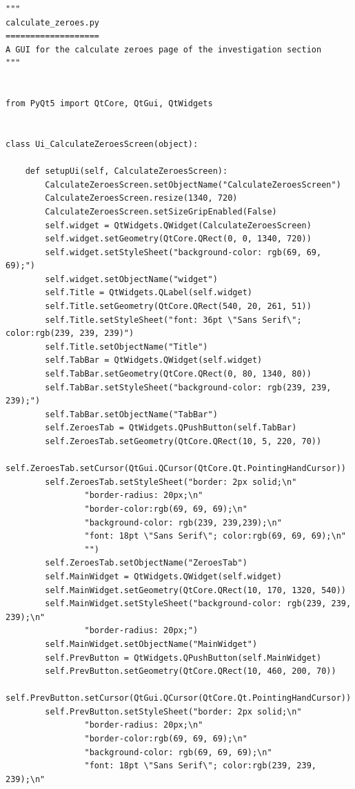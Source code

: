 \documentclass{article}
\begin{document}
\begin{lstlisting}
"""
calculate_zeroes.py
===================
A GUI for the calculate zeroes page of the investigation section
"""


from PyQt5 import QtCore, QtGui, QtWidgets


class Ui_CalculateZeroesScreen(object):

    def setupUi(self, CalculateZeroesScreen):
        CalculateZeroesScreen.setObjectName("CalculateZeroesScreen")
        CalculateZeroesScreen.resize(1340, 720)
        CalculateZeroesScreen.setSizeGripEnabled(False)
        self.widget = QtWidgets.QWidget(CalculateZeroesScreen)
        self.widget.setGeometry(QtCore.QRect(0, 0, 1340, 720))
        self.widget.setStyleSheet("background-color: rgb(69, 69, 69);")
        self.widget.setObjectName("widget")
        self.Title = QtWidgets.QLabel(self.widget)
        self.Title.setGeometry(QtCore.QRect(540, 20, 261, 51))
        self.Title.setStyleSheet("font: 36pt \"Sans Serif\"; color:rgb(239, 239, 239)")
        self.Title.setObjectName("Title")
        self.TabBar = QtWidgets.QWidget(self.widget)
        self.TabBar.setGeometry(QtCore.QRect(0, 80, 1340, 80))
        self.TabBar.setStyleSheet("background-color: rgb(239, 239, 239);")
        self.TabBar.setObjectName("TabBar")
        self.ZeroesTab = QtWidgets.QPushButton(self.TabBar)
        self.ZeroesTab.setGeometry(QtCore.QRect(10, 5, 220, 70))
        self.ZeroesTab.setCursor(QtGui.QCursor(QtCore.Qt.PointingHandCursor))
        self.ZeroesTab.setStyleSheet("border: 2px solid;\n"
                "border-radius: 20px;\n"
                "border-color:rgb(69, 69, 69);\n"
                "background-color: rgb(239, 239,239);\n"
                "font: 18pt \"Sans Serif\"; color:rgb(69, 69, 69);\n"
                "")
        self.ZeroesTab.setObjectName("ZeroesTab")
        self.MainWidget = QtWidgets.QWidget(self.widget)
        self.MainWidget.setGeometry(QtCore.QRect(10, 170, 1320, 540))
        self.MainWidget.setStyleSheet("background-color: rgb(239, 239, 239);\n"
                "border-radius: 20px;")
        self.MainWidget.setObjectName("MainWidget")
        self.PrevButton = QtWidgets.QPushButton(self.MainWidget)
        self.PrevButton.setGeometry(QtCore.QRect(10, 460, 200, 70))
        self.PrevButton.setCursor(QtGui.QCursor(QtCore.Qt.PointingHandCursor))
        self.PrevButton.setStyleSheet("border: 2px solid;\n"
                "border-radius: 20px;\n"
                "border-color:rgb(69, 69, 69);\n"
                "background-color: rgb(69, 69, 69);\n"
                "font: 18pt \"Sans Serif\"; color:rgb(239, 239, 239);\n"

\end{lstlisting}
\end{document}
